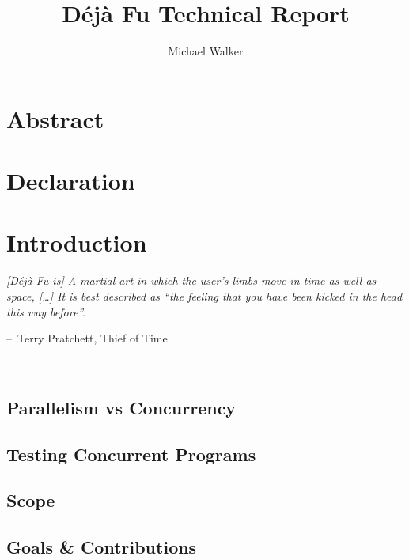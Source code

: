 \documentclass[openright, dottedtoc, headinclude, footinclude=true, a4paper, numbers=noenddot, fontsize=10pt]{scrreprt}
\title{D\'{e}j\`{a} Fu Technical Report}
\author{Michael Walker}
\makeatletter
\newcommand{\frontmatter}{\cleardoublepage\pagenumbering{roman}}
\newcommand{\mainmatter}{\cleardoublepage\pagenumbering{arabic}}
\newenvironment{chapquote}[2][2em]
  {\setlength{\@tempdima}{#1}%
   \def\chapquote@author{#2}%
   \parshape 1 \@tempdima \dimexpr\textwidth-2\@tempdima\relax%
   \itshape}
  {\par\normalfont\hfill--\
    \chapquote@author\hspace*{\@tempdima}\par\noindent\hrulefill\\[1cm]}
\newcommand{\dejafu}{D\'{e}j\`{a} Fu}
\makeatother
\begin{document}
\frontmatter



\cleardoublepage

\chapter*{Abstract}


\tableofcontents


\chapter*{Declaration}


\mainmatter

\chapter{Introduction}
\label{chap:intro}
\begin{chapquote}{Terry Pratchett, Thief of Time\nocite{pratchett2001}}
  [\dejafu{} is] A martial art in which the user's limbs move in time
  as well as space, [\ldots] It is best described as ``the feeling
  that you have been kicked in the head this way before''.
\end{chapquote}



  \section{Parallelism vs Concurrency}
  \label{sec:intro-parconc}
  

  \section{Testing Concurrent Programs}
  \label{sec:intro-testing}
  

  \section{Scope}
  \label{sec:intro-scope}
  

  \section{Goals \& Contributions}
  \label{sec:intro-contribs}
  
\end{document}
